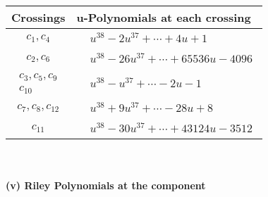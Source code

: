 \documentclass[1p]{elsarticle_modified}
\theoremstyle{definition}
\begin{document}
\begin{tabular}{m{50pt}|m{274pt}}
Crossings & \hspace{64pt}u-Polynomials at each crossing \\
\hline $$\begin{aligned}c_{1},c_{4}\end{aligned}$$&$\begin{aligned}
&u^{38}-2 u^{37}+\cdots+4 u+1
\end{aligned}$\\
\hline $$\begin{aligned}c_{2},c_{6}\end{aligned}$$&$\begin{aligned}
&u^{38}-26 u^{37}+\cdots+65536 u-4096
\end{aligned}$\\
\hline $$\begin{aligned}c_{3},c_{5},c_{9}\\c_{10}\end{aligned}$$&$\begin{aligned}
&u^{38}- u^{37}+\cdots-2 u-1
\end{aligned}$\\
\hline $$\begin{aligned}c_{7},c_{8},c_{12}\end{aligned}$$&$\begin{aligned}
&u^{38}+9 u^{37}+\cdots-28 u+8
\end{aligned}$\\
\hline $$\begin{aligned}c_{11}\end{aligned}$$&$\begin{aligned}
&u^{38}-30 u^{37}+\cdots+43124 u-3512
\end{aligned}$\\
\hline
\end{tabular}\\~\\
\newpage\renewcommand{\arraystretch}{1}
\flushleft \textbf{(v) Riley Polynomials at the component}\newline \\
\end{document}
